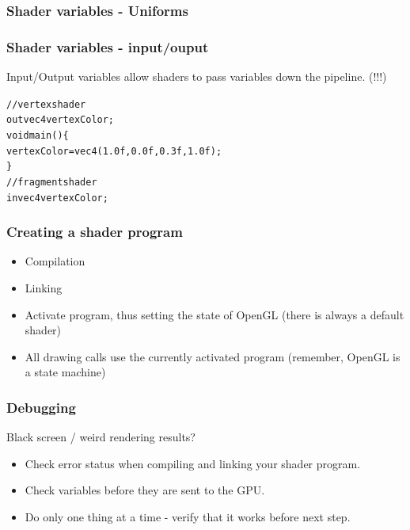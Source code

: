 \documentclass{beamer}
\begin{document}
%
%
%
\begin{frame}
\frametitle{Shader variables - Uniforms}
\end{frame}


%
%
%
\begin{frame}
\frametitle{Shader variables - input/ouput}
Input/Output variables allow shaders to pass variables down the pipeline. (!!!)
\begin{alltt}\footnotesize
// vertex shader\\
out vec4 vertexColor;\\

void main() \{\\
    vertexColor = vec4(1.0f, 0.0f, 0.3f, 1.0f);\\
\}\\

\vspace{3mm}
// fragment shader\\
in vec4 vertexColor;\\
\end{alltt}
\end{frame}


%
%
%
\begin{frame}
\frametitle{Creating a shader program}

\begin{itemize}
\item Compilation

\item Linking

\item Activate program, thus setting the state of OpenGL
(there is always a default shader)

\item All drawing calls use the currently activated program
(remember, OpenGL is a state machine)
\end{itemize}
\end{frame}

\begin{frame}
\frametitle{Debugging}

Black screen / weird rendering results?

\begin{itemize}
\item Check error status when compiling and linking your shader program.
\item Check variables before they are sent to the GPU.
\item Do only one thing at a time - verify that it works before next step.
\end{itemize}
\end{frame}
\end{document}
